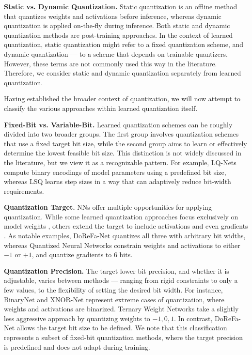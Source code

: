 \textbf{Static vs. Dynamic Quantization.} 
Static quantization is an offline method that quantizes weights and activations before inference, 
whereas dynamic quantization is applied on-the-fly during inference. 
Both static and dynamic quantization methods are post-training approaches. 
In the context of learned quantization, 
static quantization might refer to a fixed quantization scheme, 
and dynamic quantization  — to a scheme 
that depends on trainable quantizers.
However, these terms are not commonly used this way in the literature.
Therefore, we consider static and dynamic quantization separately from learned quantization. 

Having established the broader context of quantization, 
we will now attempt to classify the various approaches within learned quantization itself.

\textbf{Fixed-Bit vs. Variable-Bit.} 
Learned quantization schemes can be roughly divided into two broader groups. 
The first group involves quantization schemes that use a fixed target bit size, 
while the second group aims to learn or effectively determine the lowest feasible bit size. 
This distinction is not widely discussed in the literature, 
but we view it as a recognizable pattern. 
For example, LQ-Nets \cite{DBLP:conf/eccv/ZhangYYH18} compute binary encodings of model parameters using a predefined bit size, 
whereas LSQ \cite{DBLP:conf/iclr/EsserMBAM20} learns step sizes in a way that can adaptively reduce bit-width requirements.

\textbf{Quantization Target.} NNs offer multiple opportunities for applying quantization.
While some learned quantization approaches focus exclusively on model weights \cite{polino2018modelcompression, ott2016rnn, courbariaux2015binaryconnect, DBLP:journals/pnas/EsserMACAABMMBN16},
others extend the target to include activations \cite{krishnamoorthi2018quantizing,hubara2016qnn,rastegari2016xnor,Edouard2022SPIQ,DBLP:conf/eccv/ZhangYYH18}
and even gradients \cite{DBLP:journals/corr/LinCMB15,DBLP:conf/icml/Zhang0KALZ17}. As notable examples,
DoReFa-Net \cite{shuchang2016dorafenet} quantizes all three with arbitrary bit widths, 
whereas Quantized Neural Networks \cite{hubara2016qnn} constrain weights and activations to either 
\( -1 \) or \( +1 \), and quantize gradients to \( 6 \) bits.

\textbf{Quantization Precision.}
The target lower bit precision, and whether it is adjustable, 
varies between methods — ranging from rigid constraints to only a few values, 
to the flexibility of setting the desired bit width. 
For instance, BinaryNet \cite{DBLP:conf/nips/HubaraCSEB16} and XNOR-Net \cite{rastegari2016xnor} 
represent extreme cases of quantization, 
where weights and activations are binarized. 
Ternary Weight Networks \cite{DBLP:conf/icassp/LiuLWZY23} take a slightly less aggressive approach 
by quantizing weights to \( -1, 0, 1 \). 
In contrast, DoReFa-Net \cite{shuchang2016dorafenet} allows the target bit size to be defined.
We note that this classification represents a subset of fixed-bit quantization methods, 
where the target precision is predefined and does not adapt during training.

